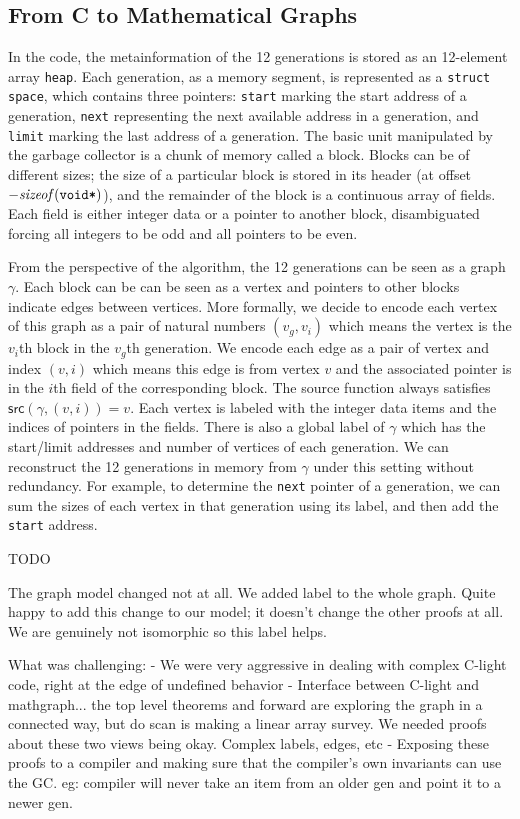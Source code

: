 \subsection{From C to Mathematical Graphs}
\label{sec:movetomathgraph}
In the code, the metainformation of the 12 generations is stored as an
12-element array \texttt{heap}. Each generation, as a memory segment,
is represented as a \texttt{struct} \texttt{space}, which contains
three pointers: \texttt{start} marking the start address of a
generation, \texttt{next} representing the next available address in a
generation, and \texttt{limit} marking the last address of a
generation. The basic unit manipulated by the garbage collector is a
chunk of memory called a block. Blocks can be of different sizes;
the size of a particular block is stored in its
header (at offset $-\mathit{sizeof}(\texttt{void*})$), and the remainder of the block 
is a continuous array of fields. 
Each field is either integer
data or a pointer to another block, disambiguated forcing all integers
to be odd and all pointers to be even.  

From the perspective of the algorithm, the 12 generations can be seen
as a graph $\gamma$. Each block can be can be seen as a
vertex and pointers to other blocks indicate edges between 
vertices. More formally, we decide to encode each vertex of this graph
as a pair of natural numbers $(v_g, v_i)$ which means the vertex is
the $v_i$th block in the $v_g$th generation. We encode each edge
as a pair of vertex and index $(v, i)$ which means this edge is from
vertex $v$ and the associated pointer is in the $i$th field of the
corresponding block.  The source function always satisfies
$\mathsf{src}(\gamma, (v, i)) = v$.
Each vertex is labeled with the integer data items and the indices of pointers in the
fields. There is also a global label of $\gamma$ which has the
start/limit addresses and number of vertices of each generation. We
can reconstruct the 12 generations in memory from $\gamma$ under this
setting without redundancy. For example, to determine the \texttt{next} pointer of
a generation, we can sum the sizes of each vertex in that generation using its label,
and then add the \texttt{start} address.

\hide
{\color{red} TODO

The graph model changed not at all. We added label to the whole graph. Quite happy to add this change to our model; it doesn't change the other proofs at all. We are genuinely not isomorphic so this label helps.

What was challenging:
	- We were very aggressive in dealing with complex C-light code, right at the edge of undefined behavior
	- Interface between C-light and mathgraph... the top level theorems and forward are exploring the graph in a connected way, but do scan is making a linear array survey. We needed proofs about these two views being okay. Complex labels, edges, etc
	- Exposing these proofs to a compiler and making sure that the compiler's own invariants can use the GC. eg: compiler will never take an item from an older gen and point it to a newer gen.
}

